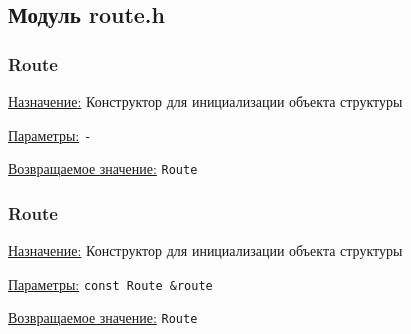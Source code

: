 \subsection{Модуль route.h}


\subsubsection{Route}

\underline{Назначение:} Конструктор для инициализации объекта структуры

\underline{Параметры:} \verb|-|

\underline{Возвращаемое значение:} \verb|Route|


\subsubsection{Route}

\underline{Назначение:} Конструктор для инициализации объекта структуры

\underline{Параметры:} \verb|const Route &route|

\underline{Возвращаемое значение:} \verb|Route|

